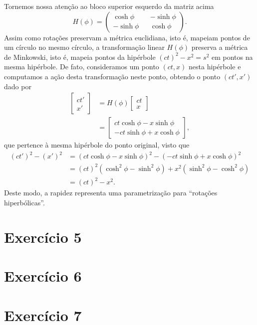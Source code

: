 \documentclass[12pt,a4paper]{article}
\numberwithin{equation}{section}
\begin{document}
Tornemos nossa atenção ao bloco superior esquerdo da matriz acima
\begin{equation*}
    H(\phi) = \begin{pmatrix}
        \cosh \phi && -\sinh \phi\\
        -\sinh \phi && \cosh \phi
    \end{pmatrix}.
\end{equation*}
Assim como rotações preservam a métrica euclidiana, isto é, mapeiam pontos de um círculo no mesmo círculo, a transformação linear \(H(\phi)\) preserva a métrica de Minkowski, isto é, mapeia pontos da hipérbole \((ct)^2 - x^2 = s^2\) em pontos na mesma hipérbole. De fato, consideramos um ponto \((ct, x)\) nesta hipérbole e computamos a ação desta transformação neste ponto, obtendo o ponto \((ct', x')\) dado por
\begin{align*}
    \begin{bmatrix}ct'\\x'\end{bmatrix} &= H(\phi) \begin{bmatrix}ct\\x\end{bmatrix}\\
                                        &= \begin{bmatrix} ct \cosh \phi - x\sinh \phi\\ -ct\sinh \phi + x \cosh \phi \end{bmatrix},
\end{align*}
que pertence à mesma hipérbole do ponto original, visto que
\begin{align*}
    (ct')^2 - (x')^2 &= (ct \cosh \phi - x \sinh \phi)^2 - (-ct \sinh \phi + x \cosh \phi)^2\\
                     &= (ct)^2 \left(\cosh^2 \phi - \sinh^2 \phi\right) + x^2 \left(\sinh^2 \phi - \cosh^2 \phi\right)\\
                     &= (ct)^2 - x^2.
\end{align*}
Deste modo, a rapidez representa uma parametrização para \enquote{rotações hiperbólicas}.

\section*{Exercício 5}
\section*{Exercício 6}
\section*{Exercício 7}
\end{document}
